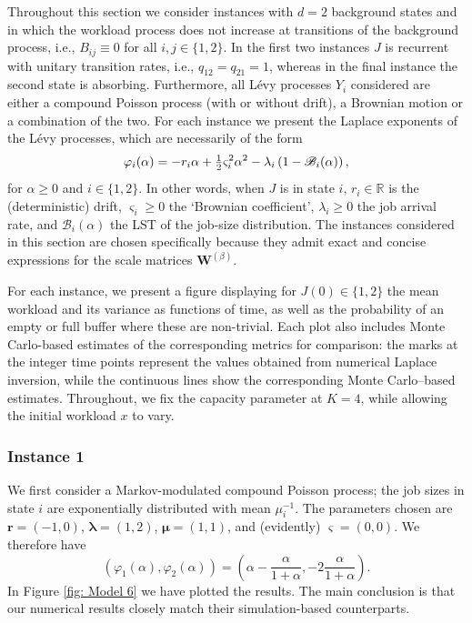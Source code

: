 \documentclass[reqno,12pt]{amsart}
\newcommand{\bs}{\boldsymbol}
\newcommand{\WS}[1]{{\color{blue}[WS: #1]}}
\begin{document}
{Throughout this section we consider instances with $d=2$ background states and in which the workload process does not increase at transitions of the background process, i.e., $B_{ij} \equiv 0$ for all $i,j\in\{1,2\}$. 
In the first two instances $J$ is recurrent with unitary transition rates, i.e., $q_{12}=q_{21}=1$, whereas in the final instance the second state is absorbing.
Furthermore, all L\'evy processes $Y_i$ considered are either a compound Poisson process (with or without drift), a Brownian motion or a combination of the two. For each instance we  present the Laplace exponents of the L\'evy processes, which are necessarily of the form%
\begin{equation}\notag
    \varphi_i(\alpha) = -r_i\alpha + \tfrac{1}{2}\varsigma_i^2\alpha^2 -\lambda_i\left(1-\mathscr{B}_i(\alpha)\right),
\end{equation}
for $\alpha\geqslant0$ and $i\in\{1,2\}$. In other words, when $J$ is  in state $i$, $r_i\in\mathbb{R}$ is the (deterministic) drift, $\varsigma_i\geqslant0$ the `Brownian coefficient', $\lambda_i\geqslant0$ the job arrival rate, and $\mathscr{B}_i(\alpha)$ the LST of the job-size distribution. The instances considered in this section are chosen specifically because they admit exact and concise expressions for the scale matrices ${\boldsymbol{W}}^{(\beta)}$. 

For each instance, we present a figure displaying for $J(0)\in\{1,2\}$ the mean workload and its variance as functions of time, as well as the probability of an empty or full buffer where these are non-trivial. Each plot also includes Monte Carlo-based estimates of the corresponding metrics for comparison: the marks at the integer time points represent the values obtained from numerical Laplace inversion, while the continuous lines show the corresponding Monte Carlo–based estimates. Throughout, we fix the capacity parameter at $K=4$, while allowing the initial workload $x$ to vary.

\subsubsection*{Instance 1}
We first consider a Markov-modulated compound Poisson process; the job sizes in state $i$ are exponentially distributed with mean $\mu_i^{-1}$. 
The parameters chosen are ${\bs r}=(-1,0)$, ${\bs \lambda}=(1,2)$, ${\bs\mu}=(1,1)$, and (evidently) ${\bs\varsigma} =(0,0)$.  We therefore have
\begin{equation*}
   \left(
        \varphi_1(\alpha),
        \varphi_2(\alpha)
    \right) 
    =
    \left(
        \alpha -\frac{\alpha}{1+\alpha},
        -2\frac{\alpha}{1+\alpha}
    \right).
\end{equation*}
In Figure \ref{fig: Model 6} we have plotted the results. The main conclusion is that our numerical results closely match their simulation-based counterparts.


}
\end{document}
